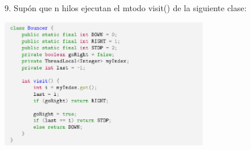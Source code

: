 \documentclass[12pt, letterpaper]{article}
\begin{document}
\begin{itemize}
\begin{itemize}
Si $n = 2$ (n es una potencia de 2)

$2^{2} = 4 \rightarrow 4$ hilos y 3 hojas

Puede dividir el \'arbol en dos sub\'arboles iguales con 2 hilos y 1 hoja(mismo caso base).

Como cada hoja tiene dos hilos, usando el algoritmo Peterson, podemos inferir que la soluci\'on tiene exclusi\'on mutua para $n = 2$.

Si $n = k$ (n es una potencia de 2)

$2^{k} \rightarrow 2^{k}$ hilos y $ (2^{k}) -1 hojas$

Puede dividir el \'arbol por $2^{(k-1)}$ sub\'arboles que son id\'enticos al caso base.
Con esto obtenemos exclusión mutua, para n = k, dados los casos anteriores.(divide y conquistaras)


\item[2. ] Libre de deadlock.

El algoritmo satisface sin bloqueo.

Similar a la evidencia previa. Como el algoritmo Peterson satisface el punto muerto para el caso base.

Y el caso donde $n = k$ puede reducirse al caso base, donde tenemos varios sub\'arboles id\'enticos.

El algoritmo de bloqueo basado en \'arbol tambi\'en est\'a libre de puntos muertos.

\item[3. ] Libre del Hambruna.

El algoritmo satisface libre de hambruna.
Similar al punto anterior.
Adem\'as, establece en la declaraci\'on que un hilo puede retrasarse por un per\'iodo finito, sin embargo, un hilo no "muere".

\end{itemize}

\item[9. ]Sup\'on que n hilos ejecutan el mtodo visit() de la siguiente clase:

\begin{center}
\includegraphics[width=0.7\textwidth]{final.png}\\
\end{center}


\end{itemize}
\end{document}
